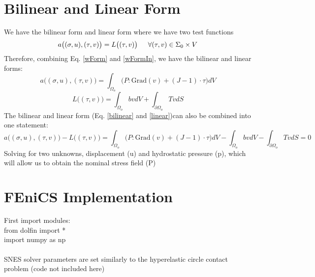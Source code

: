 \documentclass[12pt,3p]{article}
\begin{document}
\section{Bilinear and Linear Form}
We have the bilinear form and linear form where we have two test functions
\begin{equation*}
a\big((\sigma,u),(\tau, v) \big) = L\big((\tau, v) \big)  \indent \forall (\tau, v) \in \Sigma_0 \times V 
\end{equation*}
Therefore, combining Eq. \ref{wForm} and \ref{wFormIn}, we have the bilinear and linear forms: 
\begin{equation}\label{bilinear}
a\big((\sigma,u),(\tau, v) \big) = \int_{\Omega_o} \big( P : \text{Grad}(v) + (J-1) \cdot \tau \big) dV
\end{equation}
\begin{equation}\label{linear}
L\big((\tau, v) \big) = \int_{\Omega_o} b v dV + \int_{\partial \Omega_o} T v dS
\end{equation}
The bilinear and linear form (Eq. \ref{bilinear} and \ref{linear})can also be combined into one statement: 
\begin{equation}\label{F}
a\big((\sigma,u),(\tau, v) \big) - L\big((\tau, v) \big) = \int_{\Omega_o} \big( P : \text{Grad}(v) + (J-1) \cdot \tau \big) dV - \int_{\Omega_o} b v dV - \int_{\partial \Omega_o} T v dS = 0 
\end{equation}
Solving for two unknowns, displacement (u) and hydrostatic pressure (p), which will allow us to obtain the nominal stress field (P)

\section{FEniCS Implementation}
First import modules: \\
{\selectfont
from dolfin import * \\
import numpy as np \\ \\
}
SNES solver parameters are set similarly to the hyperelastic circle contact problem (code not included here) 
\end{document}
